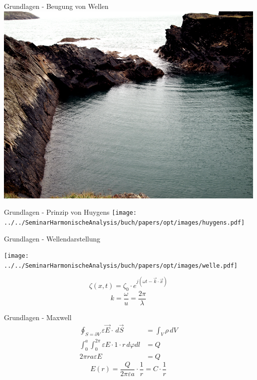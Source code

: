 \documentclass{beamer}
\begin{document}
\begin{frame}{Grundlagen - Beugung von Wellen}
    \centering
    \includegraphics[width=0.9\linewidth]{images/beugung_von_wasserwellen.png}
\end{frame}

\begin{frame}{Grundlagen - Prinzip von Huygens}
    \texttt{[image: ../../SeminarHarmonischeAnalysis/buch/papers/opt/images/huygens.pdf]}
\end{frame}

\begin{frame}{Grundlagen - Wellendarstellung}
    \begin{center}
        \texttt{[image: ../../SeminarHarmonischeAnalysis/buch/papers/opt/images/welle.pdf]}
    \end{center}
    \begin{equation*}
        \zeta(x, t)
        =
        \zeta_0 \cdot e^{j(\omega t - \vec{k}\cdot\vec{x})}
    \end{equation*}
    \begin{equation*}
        k
        =
        \frac{\omega}{u}
        =
        \frac{2 \pi}{\lambda}
    \end{equation*}
\end{frame}

\begin{frame}{Grundlagen - Maxwell}
    \begin{align*}
        \oint_{S=\partial V} \varepsilon\vec{E} \cdot\, d\vec{S}
        &=
        \int_{V}\rho\, dV
        \\
        \int_{0}^{a}\int_{0}^{2\pi} \varepsilon E\cdot 1 \cdot r\, d\varphi dl
        &=
        Q
        \\
        2\pi ra\varepsilon E
        &=
        Q
    \end{align*}
    \begin{equation*}
        E(r)
        =
        \frac{Q}{2\pi\varepsilon a} \cdot \frac{1}{r}
        =
        C \cdot \frac{1}{r}
    \end{equation*}
\end{frame}
\end{document}
